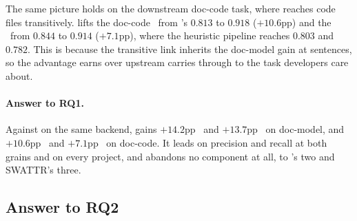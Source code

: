 The same picture holds on the downstream doc-code task, where \approach{} reaches code files transitively.
\approach{} lifts the doc-code \avgfone\ from \Artemis{}'s $0.813$ to $0.918$ ($+10.6$pp) and the \avgftwo\ from $0.844$ to $0.914$ ($+7.1$pp), 
where the heuristic \TransArc{} pipeline reaches $0.803$ and $0.782$.
This is because the transitive link inherits the doc-model gain at sentences, so the advantage \approach{} earns over \Artemis{} upstream carries through to the task developers care about.

\begin{rqanswer}
\paragraph{Answer to RQ1.}
Against \Artemis{} on the same backend, \approach{} gains $+14.2$pp \avgfone\ and $+13.7$pp \avgftwo\ on doc-model, and $+10.6$pp \avgfone\ and $+7.1$pp \avgftwo\ on doc-code.
It leads on precision and recall at both grains and on every project, and abandons no component at all, to \Artemis{}'s two and SWATTR's three.
\end{rqanswer}

\subsection{Answer to RQ2}
\label{sec:results:rq2}




